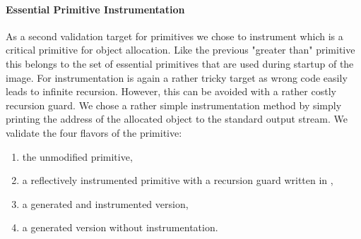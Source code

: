 \paragraph{Essential Primitive Instrumentation}
As a second validation target for primitives we chose to instrument  which is a critical primitive for object allocation.
Like the previous "greater than" primitive this belongs to the set of essential primitives that are used during startup of the image.
For instrumentation  is again a rather tricky target as wrong code easily leads to infinite recursion.
However, this can be avoided with a rather costly recursion guard.
We chose a rather simple instrumentation method by simply printing the address of the allocated object to the standard output stream.
We validate the four flavors of the  primitive:
\begin{enumerate}
	\item the unmodified primitive,
	\item a reflectively instrumented primitive with a recursion guard written in \PH,
	\item a \WF generated and instrumented version,
	\item a \WF generated version without instrumentation.
\end{enumerate}

